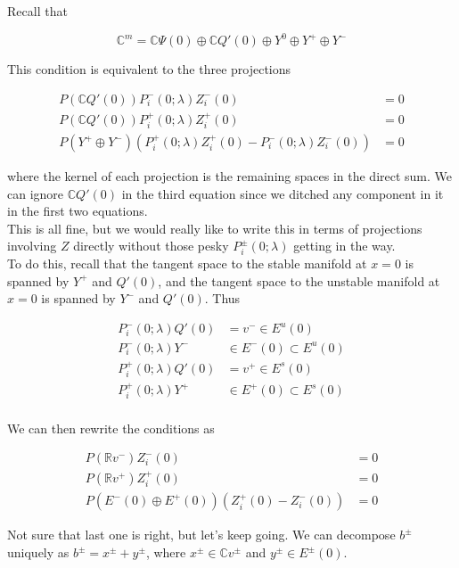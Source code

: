 \documentclass[12pt]{article}
\def\R{{\mathbb R}}
\def\C{{\mathbb C}}
\begin{document}
Recall that

\[
\C^m = \C \Psi(0) \oplus \C Q'(0) \oplus Y^0 \oplus Y^+ \oplus Y^- 
\]

This condition is equivalent to the three projections

\begin{align*}
P(\C Q'(0)) P_i^-(0; \lambda) Z_i^-(0) &= 0 \\
P(\C Q'(0)) P_i^+(0; \lambda) Z_i^+(0) &= 0 \\
P(Y^+ \oplus Y^-) ( P_i^+(0; \lambda) Z_i^+(0) - P_i^-(0; \lambda) Z_i^-(0) ) &= 0
\end{align*}

where the kernel of each projection is the remaining spaces in the direct sum. We can ignore $\C Q'(0)$ in the third equation since we ditched any component in it in the first two equations.\\

This is all fine, but we would really like to write this in terms of projections involving $Z$ directly without those pesky $P_i^\pm(0; \lambda)$ getting in the way.\\

To do this, recall that the tangent space to the stable manifold at $x = 0$ is spanned by $Y^+$ and $Q'(0)$, and the tangent space to the unstable manifold at $x = 0$ is spanned by $Y^-$ and $Q'(0)$. Thus

\begin{align*}
P_i^-(0; \lambda) Q'(0) &= v^- \in E^u(0) \\
P_i^-(0; \lambda) Y^- &\in E^-(0) \subset E^u(0) \\
P_i^+(0; \lambda) Q'(0) &= v^+ \in E^s(0) \\
P_i^+(0; \lambda) Y^+ &\in E^+(0) \subset E^s(0) \\
\end{align*}

We can then rewrite the conditions as

\begin{align*}
P(\R v^- ) Z_i^-(0) &= 0 \\
P(\R v^+ ) Z_i^+(0) &= 0 \\
P( E^-(0) \oplus E^+(0) ) ( Z_i^+(0) - Z_i^-(0) ) &= 0
\end{align*}

Not sure that last one is right, but let's keep going. We can decompose $b^\pm$ uniquely as $b^\pm = x^\pm + y^\pm$, where $x^\pm \in \C v^\pm$ and $y^\pm \in E^\pm(0)$.\\
\end{document}
